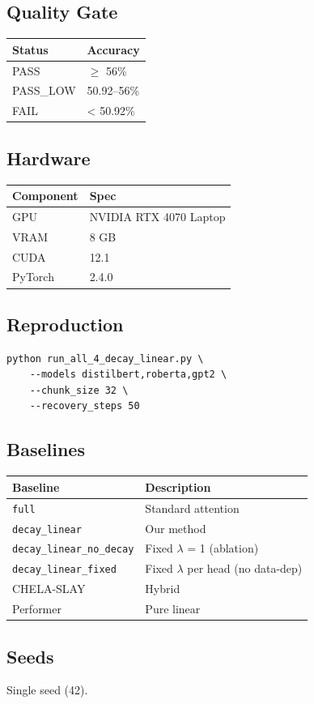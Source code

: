 \subsection{Quality Gate}

\begin{table}[H]
\centering
\small
\begin{tabular}{ll}
\toprule
\textbf{Status} & \textbf{Accuracy} \\
\midrule
PASS & $\ge$ 56\% \\
PASS\_LOW & 50.92--56\% \\
FAIL & < 50.92\% \\
\bottomrule
\end{tabular}
\end{table}

\subsection{Hardware}

\begin{table}[H]
\centering
\small
\begin{tabular}{ll}
\toprule
\textbf{Component} & \textbf{Spec} \\
\midrule
GPU & NVIDIA RTX 4070 Laptop \\
VRAM & 8 GB \\
CUDA & 12.1 \\
PyTorch & 2.4.0 \\
\bottomrule
\end{tabular}
\end{table}

\subsection{Reproduction}

\begin{lstlisting}
python run_all_4_decay_linear.py \
    --models distilbert,roberta,gpt2 \
    --chunk_size 32 \
    --recovery_steps 50
\end{lstlisting}

\subsection{Baselines}

\begin{table}[H]
\centering
\small
\begin{tabular}{ll}
\toprule
\textbf{Baseline} & \textbf{Description} \\
\midrule
\texttt{full} & Standard attention \\
\texttt{decay\_linear} & Our method \\
\texttt{decay\_linear\_no\_decay} & Fixed $\lambda$ = 1 (ablation) \\
\texttt{decay\_linear\_fixed} & Fixed $\lambda$ per head (no data-dep) \\
CHELA-SLAY & Hybrid \\
Performer & Pure linear \\
\bottomrule
\end{tabular}
\end{table}

\subsection{Seeds}

Single seed (42).

